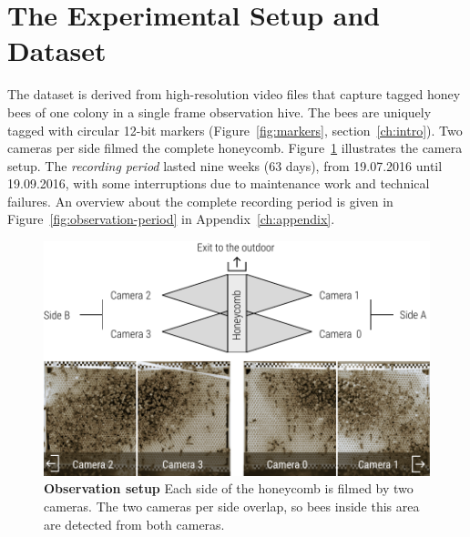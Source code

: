 \section{The Experimental Setup and Dataset}

The dataset is derived from high-resolution video files that capture tagged honey bees of one colony in a single frame observation hive.
The bees are uniquely tagged with circular 12-bit markers (Figure~\ref{fig:markers}, section~\ref{ch:intro}).
Two cameras per side filmed the complete honeycomb.
Figure~\ref{fig:obssetup} illustrates the camera setup.
The \emph{recording period} lasted nine weeks (63 days), from 19.07.2016 until 19.09.2016, with some interruptions due to maintenance work and technical failures.
An overview about the complete recording period is given in Figure~\ref{fig:observation-period} in Appendix~\ref{ch:appendix}.

\begin{figure}[htbp]
	\centering
	\includegraphics[width=1.0\textwidth]{Figures/setupCams}
 	\caption[Observation setup]{\textbf{Observation setup} Each side of the honeycomb is filmed by two cameras. The two cameras per side overlap, so bees inside this area are detected from both cameras.}
 	\label{fig:obssetup}
\end{figure}

